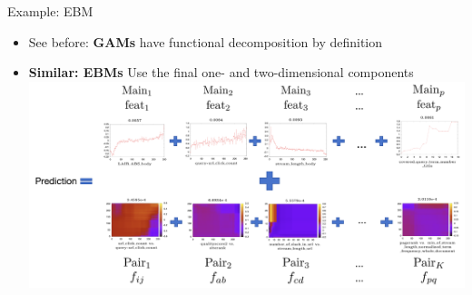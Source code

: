 \documentclass[11pt,compress,t,notes=noshow, aspectratio=169, xcolor=table]{beamer}
\begin{document}
\begin{frame}{Example: EBM}

    \begin{itemize}
        \item See before: \textbf{GAMs} have functional decomposition by definition
        \item \textbf{Similar: EBMs} Use the final one- and two-dimensional components %
        {
        \centering
        \includegraphics[width=\linewidth]{figure/final_ebm.png}
        }
    \end{itemize}
    
\end{frame}



\endlecture
\end{document}
